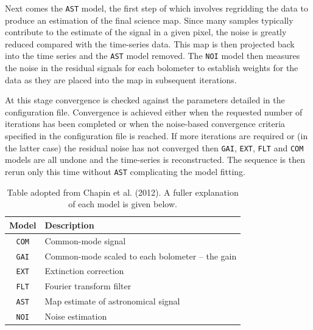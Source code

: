 \documentclass[twoside,11pt]{article}
\renewcommand{\_}{\texttt{\symbol{95}}}
\begin{document}
Next comes the \texttt{AST} model, the first step of which involves
regridding the data to produce an estimation of the final science map.
Since many samples typically contribute to the estimate of the signal
in a given pixel, the noise is greatly reduced compared with the
time-series data. This map is then projected back into the time series
and the \texttt{AST} model removed. The \texttt{NOI} model then
measures the noise in the residual signals for each bolometer to
establish weights for the data as they are placed into the map in
subsequent iterations.

At this stage convergence is checked against the parameters detailed
in the configuration file.  Convergence is achieved either when the
requested number of iterations has been completed or when the
noise-based convergence criteria specified in the configuration file
is reached. If more iterations are required or (in the latter case)
the residual noise has not converged then \texttt{GAI}, \texttt{EXT},
\texttt{FLT} and \texttt{COM} models are all undone and the
time-series is reconstructed. The sequence is then rerun only this
time without \texttt{AST} complicating the model fitting.

\setlength{\extrarowheight}{3pt}
\begin{table}
\centering
\begin{tabular}{c|l}
\hline
\textbf{Model} &\hspace{0.2cm} \textbf{Description} \\
\hline
\texttt{COM}&\hspace{0.2cm} Common-mode signal\\
\texttt{GAI}&\hspace{0.2cm} Common-mode scaled to each bolometer -- the gain\\
\texttt{EXT}&\hspace{0.2cm} Extinction correction\\
\texttt{FLT}&\hspace{0.2cm} Fourier transform filter\\
\texttt{AST}&\hspace{0.2cm} Map estimate of astronomical signal\\
\texttt{NOI}&\hspace{0.2cm} Noise estimation\\
\hline
\end{tabular}
\label{tab:mods}
\caption{\small Table adopted from Chapin et al. (2012). A fuller
explanation of each model is given below.}
\end{table}
\end{document}
